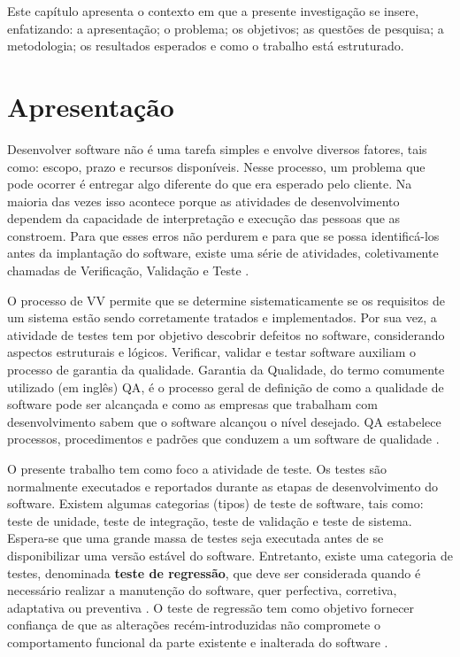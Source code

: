 
\acresetall 
Este capítulo apresenta o contexto em que a presente investigação se insere, enfatizando: a apresentação; o problema; os objetivos; as questões de pesquisa; a metodologia; os resultados esperados e como o trabalho está estruturado.

\section{Apresentação}\label{sec:apresentacao}
Desenvolver software não é uma tarefa simples e envolve diversos fatores, tais como: escopo, prazo e recursos disponíveis. Nesse processo, um problema que pode ocorrer é entregar algo diferente do que era esperado pelo cliente. Na maioria das vezes isso acontece porque as atividades de desenvolvimento dependem da capacidade de interpretação e execução das pessoas que as constroem. Para que esses erros não perdurem e para que se possa identificá-los antes da implantação do software, existe uma série de atividades, coletivamente chamadas de Verificação, Validação e Teste \cite{DELAMARO2007}. 

O processo de \ac{VV} permite que se determine sistematicamente se os requisitos de um sistema estão sendo corretamente tratados e implementados. Por sua vez, a atividade de testes tem por objetivo descobrir defeitos no software, considerando aspectos estruturais e lógicos. Verificar, validar e testar software auxiliam o processo de garantia da qualidade. Garantia da Qualidade, do termo comumente utilizado (em inglês) \ac{QA}, é o processo geral de definição de como a qualidade de software pode ser alcançada e como as empresas que trabalham com desenvolvimento sabem que o software alcançou o nível desejado. \ac{QA} estabelece processos, procedimentos e padrões que conduzem a um software de qualidade \cite{HIRAMA2011}. 

O presente trabalho tem como foco a atividade de teste. Os testes são normalmente executados e reportados durante as etapas de desenvolvimento do software. Existem algumas categorias (tipos) de teste de software, tais como: teste de unidade, teste de integração, teste de validação e teste de sistema. Espera-se que uma grande massa de testes seja executada antes de se disponibilizar uma versão estável do software. Entretanto, existe uma categoria de testes, denominada \textbf{teste de regressão}, que deve ser considerada quando é necessário realizar a manutenção do software, quer perfectiva, corretiva, adaptativa ou preventiva \cite{DBLP:series/springer/Mens08}. O teste de regressão tem como objetivo fornecer confiança de que as alterações recém-introduzidas não compromete o comportamento funcional da parte existente e inalterada do software \cite{Yoo:2012:RTM:2284811.2284813}.

